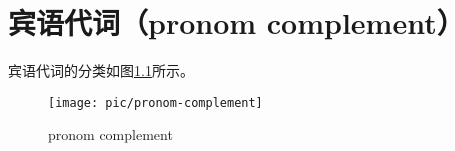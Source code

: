 
\chapter{宾语代词（pronom complement）}
\label{cha:pronom-complement}

宾语代词的分类如图\ref{fig:pronom-complement}所示。

\begin{figure}[!ht]
  \centering
  \texttt{[image: pic/pronom-complement]}
  \caption{pronom complement}
  \label{fig:pronom-complement}
\end{figure}






